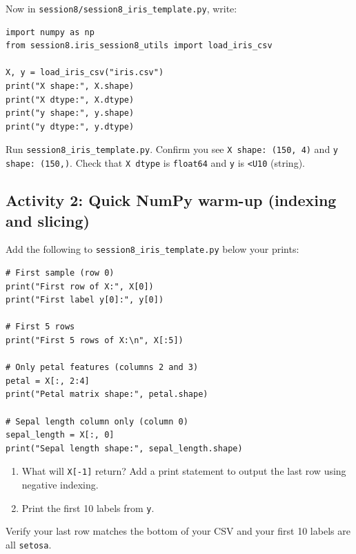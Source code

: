 Now in \texttt{session8/session8\_iris\_template.py}, write:
\begin{verbatim}
import numpy as np
from session8.iris_session8_utils import load_iris_csv

X, y = load_iris_csv("iris.csv")
print("X shape:", X.shape)
print("X dtype:", X.dtype)
print("y shape:", y.shape)
print("y dtype:", y.dtype)
\end{verbatim}

\begin{tcolorbox}[title=Checkpoint]
Run \texttt{session8\_iris\_template.py}. Confirm you see \texttt{X shape: (150, 4)} and \texttt{y shape: (150,)}. Check that \texttt{X dtype} is \texttt{float64} and \texttt{y} is \texttt{<U10} (string).
\end{tcolorbox}

\newpage
\subsection{Activity 2: Quick NumPy warm-up (indexing and slicing)}

\noindent
Add the following to \texttt{session8\_iris\_template.py} below your prints:

\begin{verbatim}
# First sample (row 0)
print("First row of X:", X[0])
print("First label y[0]:", y[0])

# First 5 rows
print("First 5 rows of X:\n", X[:5])

# Only petal features (columns 2 and 3)
petal = X[:, 2:4]
print("Petal matrix shape:", petal.shape)

# Sepal length column only (column 0)
sepal_length = X[:, 0]
print("Sepal length shape:", sepal_length.shape)
\end{verbatim}

\begin{tcolorbox}[title=Do: Your Task]
\begin{enumerate}
    \item What will \texttt{X[-1]} return? Add a print statement to output the last row using negative indexing.
    \item Print the first 10 labels from \texttt{y}.
\end{enumerate}
\end{tcolorbox}

\begin{tcolorbox}[title=Checkpoint]
Verify your last row matches the bottom of your CSV and your first 10 labels are all \texttt{setosa}.
\end{tcolorbox}

